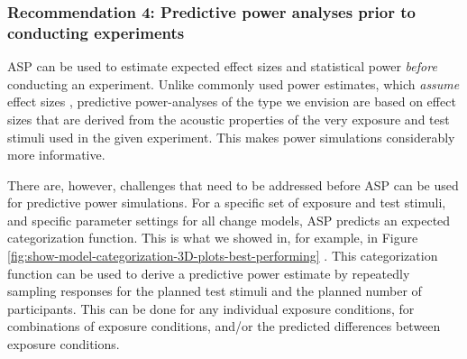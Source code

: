 \documentclass[
  11pt,
  man,floatsintext]{apa6}
\begin{document}
\hypertarget{recommendation-4-predictive-power-analyses-prior-to-conducting-experiments}{%
\subsubsection{Recommendation 4: Predictive power analyses prior to conducting experiments}\label{recommendation-4-predictive-power-analyses-prior-to-conducting-experiments}}

ASP can be used to estimate expected effect sizes and statistical power \emph{before} conducting an experiment. Unlike commonly used power estimates, which \emph{assume} effect sizes \autocite[e.g., ``moderate'' effects,][]{zheng-samuel2020}, predictive power-analyses of the type we envision are based on effect sizes that are derived from the acoustic properties of the very exposure and test stimuli used in the given experiment. This makes power simulations considerably more informative.

There are, however, challenges that need to be addressed before ASP can be used for predictive power simulations. For a specific set of exposure and test stimuli, and specific parameter settings for all change models, ASP predicts an expected categorization function. This is what we showed in, for example, in Figure \ref{fig:show-model-categorization-3D-plots-best-performing} \autocites[see also, e.g.,][]{tan2021,theodore-monto2019}[ for similar approaches]{xie2021cognition}. This categorization function can be used to derive a predictive power estimate by repeatedly sampling responses for the planned test stimuli and the planned number of participants. This can be done for any individual exposure conditions, for combinations of exposure conditions, and/or the predicted differences between exposure conditions.
\end{document}
